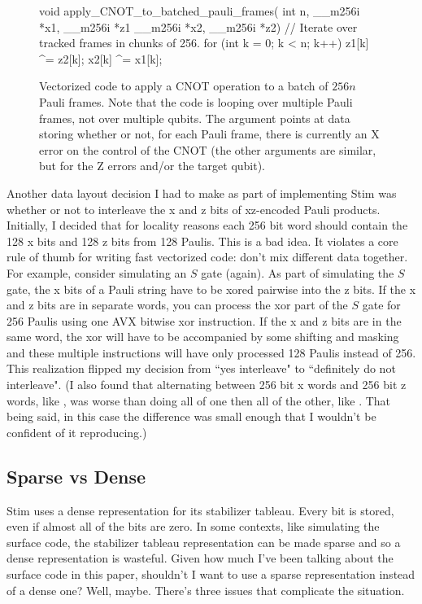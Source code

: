 \documentclass[onecolumn,unpublished]{quantumarticle}
\theoremstyle{definition}
\theoremstyle{definition}
\theoremstyle{definition}
\begin{document}
\begin{figure}
    \centering
\begin{cpp}
    void apply_CNOT_to_batched_pauli_frames(
            int n, __m256i *x1, __m256i *z1 __m256i *x2, __m256i *z2) {
        // Iterate over tracked frames in chunks of 256.
        for (int k = 0; k < n; k++) {
            z1[k] ^= z2[k];
            x2[k] ^= x1[k];
        }
    }
\end{cpp}
    \caption{
        Vectorized code to apply a CNOT operation to a batch of $256n$ Pauli frames.
        Note that the code is looping over multiple Pauli frames, not over multiple qubits.
        The argument \protect{} points at data storing whether or not, for each Pauli frame, there is currently an X error on the control of the CNOT (the other arguments are similar, but for the Z errors and/or the target qubit).
    }
    \label{fig:pauli_frame_code}
\end{figure}

Another data layout decision I had to make as part of implementing Stim was whether or not to interleave the x and z bits of xz-encoded Pauli products.
Initially, I decided that for locality reasons each 256 bit word should contain the 128 x bits and 128 z bits from 128 Paulis.
This is a bad idea.
It violates a core rule of thumb for writing fast vectorized code: don't mix different data together.
For example, consider simulating an $S$ gate (again).
As part of simulating the $S$ gate, the x bits of a Pauli string have to be xored pairwise into the z bits.
If the x and z bits are in separate words, you can process the xor part of the $S$ gate for 256 Paulis using one AVX bitwise xor instruction.
If the x and z bits are in the same word, the xor will have to be accompanied by some shifting and masking and these multiple instructions will have only processed 128 Paulis instead of 256.
This realization flipped my decision from ``yes interleave" to ``definitely do not interleave".
(I also  found that alternating between 256 bit x words and 256 bit z words, like , was worse than doing all of one then all of the other, like .
That being said, in this case the difference was small enough that I wouldn't be confident of it reproducing.)

\subsection{Sparse vs Dense}
\label{sec:sparsevdense}

Stim uses a dense representation for its stabilizer tableau.
Every bit is stored, even if almost all of the bits are zero.
In some contexts, like simulating the surface code, the stabilizer tableau representation can be made sparse and so a dense representation is wasteful.
Given how much I've been talking about the surface code in this paper, shouldn't I want to use a sparse representation instead of a dense one?
Well, maybe.
There's three issues that complicate the situation.
\end{document}
